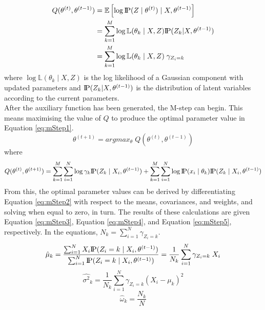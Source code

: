 \begin{align}
    \label{eq:eStep2}
    Q(\theta^{(t)}, \theta^{(t-1)}) &= \mathbb{E}\left[ \log \text{I\kern-0.15em P}(Z \; | \; \theta^{(t)}) \; | \; X, \theta^{(t-1)} \right] \\
    &= \sum^M_{k=1} \log \mathbb{L} (\theta_k \; | \; X, Z) \text{I\kern-0.15em P}(Z_k | X, \theta^{(t-1)}) \\
    &= \sum^M_{k=1} \log \mathbb{L} (\theta_k \; | \; X, Z) \; \gamma_{Z_i = k}
\end{align}
where $\log \mathbb{L} (\theta_k \; | \; X, Z)$ is the log likelihood of a Gaussian component with updated parameters and $\text{I\kern-0.15em P}(Z_k | X, \theta^{(t-1)})$ is the distribution of latent variables according to the current parameters.
\smallskip \\ \indent
After the auxiliary function has been generated, the M-step can begin. This means maximising the value of $Q$ to produce the optimal parameter value in Equation \ref{eq:mStep1}.
\begin{equation}
    \label{eq:mStep1}
    \theta^{(t+1)} = argmax_\theta \; Q(\theta^{(t)}, \theta^{(t-1)})
\end{equation}
where
\begin{equation}
    \label{eq:mStep2}
    Q(\theta^{(t)}, \theta^{(t+1)}) = \sum^M_{k=1} \sum^N_{i=1} \log \gamma_k \text{I\kern-0.15em P}(Z_k \; | \; X_i, \theta^{(t-1)}) + \sum^M_{k=1} \sum^N_{i=1} \log \text{I\kern-0.15em P} (x_i \; | \; \theta_k) \text{I\kern-0.15em P} (Z_k \; | \; X_i, \theta^{(t-1)})
\end{equation}
\indent
From this, the optimal parameter values can be derived by differentiating Equation \ref{eq:mStep2} with respect to the means, covariances, and weights, and solving when equal to zero, in turn. The results of these calculations are given Equation \ref{eq:mStep3}, Equation \ref{eq:mStep4}, and Equation \ref{eq:mStep5}, respectively. In the equations, $N_k = \sum^N_{i=1} \gamma_{Z_i = k}$.
\begin{equation}
    \label{eq:mStep3}
    \hat{\mu}_k = \frac{\sum^N_{i=1} X_i \text{I\kern-0.15em P}(Z_i = k \; | \; X_i, \theta^{(t-1)})}{\sum^N_{i=1} \text{I\kern-0.15em P}(Z_i = k \; | \; X_i, \theta^{(t-1)})} = \frac{1}{N_k} \sum^N_{i=1} \gamma_{Z_i = k} \; X_i
\end{equation}
\begin{equation}
    \label{eq:mStep4}
    \hat{\sigma^2}_k = \frac{1}{N_k} \sum^N_{i=1} \gamma_{Z_i=k} (X_i - \mu_k)^2
\end{equation}
\begin{equation}
    \label{eq:mStep5}
    \hat{\omega}_k = \frac{N_k}{N}
\end{equation}


